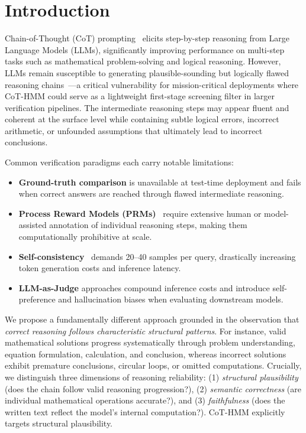 \documentclass[runningheads]{llncs}
\begin{document}
\section{Introduction}

Chain-of-Thought (CoT) prompting~\cite{wei2022chain} elicits step-by-step reasoning from Large Language Models (LLMs), significantly improving performance on multi-step tasks such as mathematical problem-solving and logical reasoning. However, LLMs remain susceptible to generating plausible-sounding but logically flawed reasoning chains~\cite{ji2023survey}---a critical vulnerability for mission-critical deployments where CoT-HMM could serve as a lightweight first-stage screening filter in larger verification pipelines. The intermediate reasoning steps may appear fluent and coherent at the surface level while containing subtle logical errors, incorrect arithmetic, or unfounded assumptions that ultimately lead to incorrect conclusions.

Common verification paradigms each carry notable limitations:
\begin{itemize}
    \item \textbf{Ground-truth comparison} is unavailable at test-time deployment and fails when correct answers are reached through flawed intermediate reasoning.
    \item \textbf{Process Reward Models (PRMs)}~\cite{lightman2024let} require extensive human or model-assisted annotation of individual reasoning steps, making them computationally prohibitive at scale.
    \item \textbf{Self-consistency}~\cite{wang2023self} demands 20--40 samples per query, drastically increasing token generation costs and inference latency.
    \item \textbf{LLM-as-Judge} approaches compound inference costs and introduce self-preference and hallucination biases when evaluating downstream models.
\end{itemize}

We propose a fundamentally different approach grounded in the observation that \textit{correct reasoning follows characteristic structural patterns}. For instance, valid mathematical solutions progress systematically through problem understanding, equation formulation, calculation, and conclusion, whereas incorrect solutions exhibit premature conclusions, circular loops, or omitted computations. Crucially, we distinguish three dimensions of reasoning reliability: (1) \textit{structural plausibility} (does the chain follow valid reasoning progression?), (2) \textit{semantic correctness} (are individual mathematical operations accurate?), and (3) \textit{faithfulness} (does the written text reflect the model's internal computation?). CoT-HMM explicitly targets structural plausibility.
\end{document}
